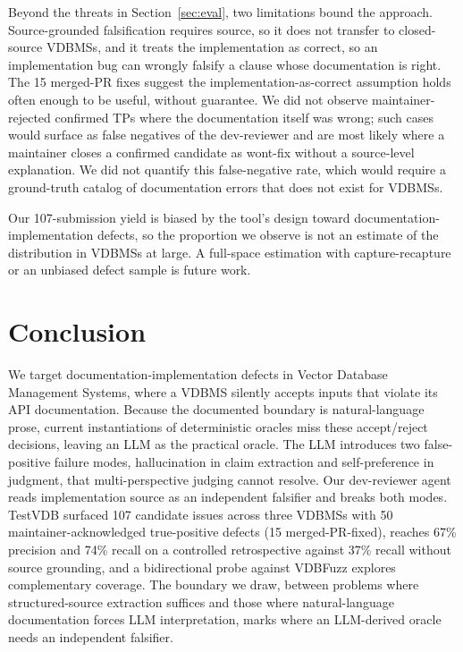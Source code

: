 \documentclass[sigconf]{acmart}
\begin{document}
Beyond the threats in Section~\ref{sec:eval}, two limitations bound the approach. Source-grounded falsification requires source, so it does not transfer to closed-source VDBMSs, and it treats the implementation as correct, so an implementation bug can wrongly falsify a clause whose documentation is right. The 15 merged-PR fixes suggest the implementation-as-correct assumption holds often enough to be useful, without guarantee. We did not observe maintainer-rejected confirmed TPs where the documentation itself was wrong; such cases would surface as false negatives of the dev-reviewer and are most likely where a maintainer closes a confirmed candidate as wont-fix without a source-level explanation. We did not quantify this false-negative rate, which would require a ground-truth catalog of documentation errors that does not exist for VDBMSs.

Our 107-submission yield is biased by the tool's design toward documentation-implementation defects, so the proportion we observe is not an estimate of the distribution in VDBMSs at large. A full-space estimation with capture-recapture or an unbiased defect sample is future work.

\section{Conclusion}
\label{sec:concl}

We target documentation-implementation defects in Vector Database Management Systems, where a VDBMS silently accepts inputs that violate its API documentation. Because the documented boundary is natural-language prose, current instantiations of deterministic oracles miss these accept/reject decisions, leaving an LLM as the practical oracle. The LLM introduces two false-positive failure modes, hallucination in claim extraction and self-preference in judgment, that multi-perspective judging cannot resolve. Our dev-reviewer agent reads implementation source as an independent falsifier and breaks both modes. TestVDB surfaced 107 candidate issues across three VDBMSs with 50 maintainer-acknowledged true-positive defects (15 merged-PR-fixed), reaches 67\% precision and 74\% recall on a controlled retrospective against 37\% recall without source grounding, and a bidirectional probe against VDBFuzz explores complementary coverage. The boundary we draw, between problems where structured-source extraction suffices and those where natural-language documentation forces LLM interpretation, marks where an LLM-derived oracle needs an independent falsifier.
\end{document}
